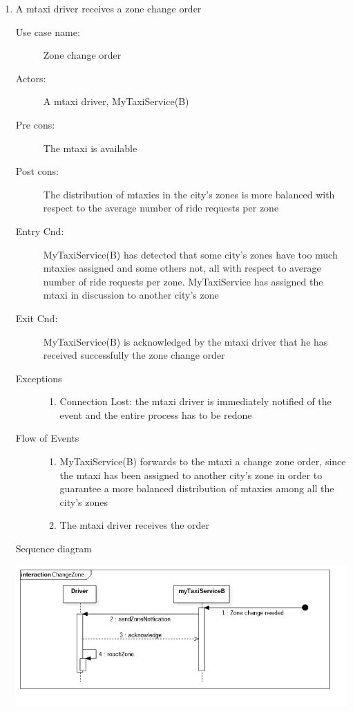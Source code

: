 \documentclass[11pt]{article} %
\begin{document}
\begin{enumerate}
	
	      \item A mtaxi driver receives a zone change order
		\begin{description}
		        \item [Use case name:] Zone change order
		        \item [Actors:] A mtaxi driver, MyTaxiService(B)
		        \item [Pre cons:] The mtaxi is available
		        \item [Post cons:] The distribution of mtaxies in the city's zones is more balanced
		        with respect to the average number of ride requests per zone
		        \item [Entry Cnd:] MyTaxiService(B) has detected that some city's zones have too much mtaxies assigned
		        and some others not, all with respect to average number of ride requests per zone. MyTaxiService
		        has assigned the mtaxi in discussion to another city's zone
		        \item [Exit Cnd:] MyTaxiService(B) is acknowledged by the mtaxi driver that he has received successfully
		        the zone change order
		        \item [Exceptions]\hfill
			\begin{enumerate}
			          \item Connection Lost: the mtaxi driver is immediately notified of the event and the entire process has to be redone
			\end{enumerate}
		        \item [Flow of Events]\hfill
			\begin{enumerate}
			          \item MyTaxiService(B) forwards to the mtaxi a change zone order, since the mtaxi has been assigned to another city's zone in order to guarantee
			          a more balanced distribution of mtaxies among all the city's zones
			          \item The mtaxi driver receives the order
			\end{enumerate}
		\end{description}
		Sequence diagram
		\begin{center}
		\includegraphics[scale=0.52]{usecase10.png}
		\end{center}
	

\end{enumerate}
\end{document}
